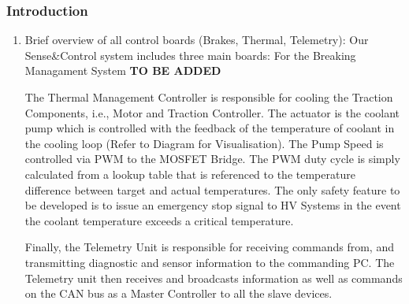 \subsubsection{Introduction}
\begin{enumerate}
    \item Brief overview of all control boards (Brakes, Thermal, Telemetry):
Our Sense&Control system includes three main boards:
For the Breaking Managament System \textbf{TO BE ADDED}

The Thermal Management Controller is responsible for cooling the Traction Components, i.e., Motor and Traction Controller. The actuator is the coolant pump which is controlled  with the feedback of the temperature of coolant in the cooling loop (Refer to Diagram for Visualisation).  The Pump Speed is controlled via PWM to the MOSFET Bridge. The PWM duty cycle is simply calculated from a lookup table that is referenced to the temperature difference between target and actual temperatures. The only safety feature to be developed is to issue an emergency stop signal to HV Systems in the event the coolant temperature exceeds a critical temperature.

Finally,  the Telemetry Unit is responsible for receiving commands from, and transmitting diagnostic and sensor information to the commanding PC. The Telemetry unit then receives and broadcasts information as well as commands on the CAN bus as a Master Controller to all the slave devices. \\


\end{enumerate}
